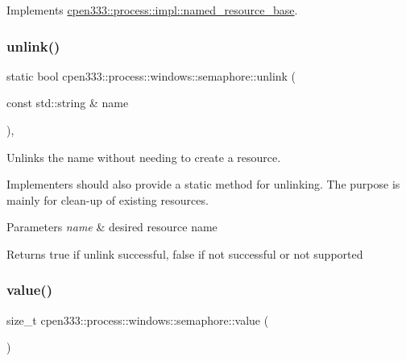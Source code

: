 Implements \hyperlink{classcpen333_1_1process_1_1impl_1_1named__resource__base_ae4033f82dfd068b917a9bca57d3a0c45}{cpen333\+::process\+::impl\+::named\+\_\+resource\+\_\+base}.

\mbox{\label{classcpen333_1_1process_1_1windows_1_1semaphore_ae3837124e878a66370b7e1931c6b1bf8}} 
\subsubsection{\texorpdfstring{unlink()}{unlink()}\hspace{0.1cm}{\footnotesize\ttfamily [2/2]}}
{\footnotesize\ttfamily static bool cpen333\+::process\+::windows\+::semaphore\+::unlink (\begin{DoxyParamCaption}\item[{const std\+::string \&}]{name }\end{DoxyParamCaption})\hspace{0.3cm}{\ttfamily [inline]}, {\ttfamily [static]}}



Unlinks the name without needing to create a resource. 

Implementers should also provide a static method for unlinking. The purpose is mainly for clean-\/up of existing resources.


\begin{DoxyParams}{Parameters}
{\em name} & desired resource name \\
\hline
\end{DoxyParams}
\begin{DoxyReturn}{Returns}
{\ttfamily true} if unlink successful, {\ttfamily false} if not successful or not supported 
\end{DoxyReturn}
\mbox{\label{classcpen333_1_1process_1_1windows_1_1semaphore_a15245feed98e3cf8a428c0a218f33012}} 
\subsubsection{\texorpdfstring{value()}{value()}}
{\footnotesize\ttfamily size\+\_\+t cpen333\+::process\+::windows\+::semaphore\+::value (\begin{DoxyParamCaption}{ }\end{DoxyParamCaption})\hspace{0.3cm}{\ttfamily [inline]}}



